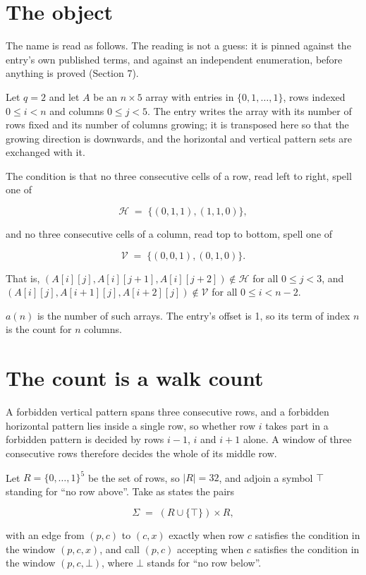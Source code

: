 \documentclass[11pt]{article}
\theoremstyle{definition}
\begin{document}
\section{The object}

The name is read as follows. The reading is not a guess: it is pinned against the entry's own published terms, and against an independent enumeration, before anything is proved (Section 7).

Let $q = 2$ and let $A$ be an $n \times 5$ array with entries in $\{0,1,\dots,1\}$, rows indexed $0 \le i < n$ and columns $0 \le j < 5$. The entry writes the array with its number of rows fixed and its number of columns growing; it is transposed here so that the growing direction is downwards, and the horizontal and vertical pattern sets are exchanged with it.

The condition is that no three consecutive cells of a row, read left to right, spell one of

\[\mathcal{H} \;=\; \{(0,1,1), (1,1,0)\},\]

and no three consecutive cells of a column, read top to bottom, spell one of

\[\mathcal{V} \;=\; \{(0,0,1), (0,1,0)\}.\]

That is, $(A[i][j],A[i][j{+}1],A[i][j{+}2]) \notin \mathcal{H}$ for all $0 \le j < 3$, and $(A[i][j],A[i{+}1][j],A[i{+}2][j]) \notin \mathcal{V}$ for all $0 \le i < n-2$.

$a(n)$ is the number of such arrays. The entry's offset is 1, so its term of index $n$ is the count for $n$ columns.

\section{The count is a walk count}

A forbidden vertical pattern spans three consecutive rows, and a forbidden horizontal pattern lies inside a single row, so whether row $i$ takes part in a forbidden pattern is decided by rows $i-1$, $i$ and $i+1$ alone. A window of three consecutive rows therefore decides the whole of its middle row.

Let $R = \{0,\dots,1\}^{5}$ be the set of rows, so $|R| = 32$, and adjoin a symbol $\top$ standing for ``no row above''. Take as states the pairs

\[\Sigma \;=\; (R \cup \{\top\}) \times R,\]

with an edge from $(p,c)$ to $(c,x)$ exactly when row $c$ satisfies the condition in the window $(p,c,x)$, and call $(p,c)$ accepting when $c$ satisfies the condition in the window $(p,c,\bot)$, where $\bot$ stands for ``no row below''.
\end{document}
